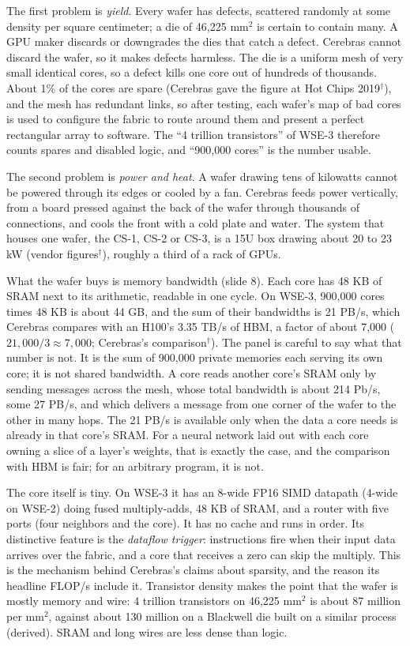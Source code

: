 \documentclass[11pt,letterpaper]{article}
\begin{document}
The first problem is \emph{yield}. Every wafer has defects, scattered randomly at some density per square centimeter; a die of 46{,}225 mm$^2$ is certain to contain many. A GPU maker discards or downgrades the dies that catch a defect. Cerebras cannot discard the wafer, so it makes defects harmless. The die is a uniform mesh of very small identical cores, so a defect kills one core out of hundreds of thousands. About 1\% of the cores are spare (Cerebras gave the figure at Hot Chips 2019$^\dagger$), and the mesh has redundant links, so after testing, each wafer's map of bad cores is used to configure the fabric to route around them and present a perfect rectangular array to software. The ``4 trillion transistors'' of WSE-3 therefore counts spares and disabled logic, and ``900{,}000 cores'' is the number usable.

The second problem is \emph{power and heat}. A wafer drawing tens of kilowatts cannot be powered through its edges or cooled by a fan. Cerebras feeds power vertically, from a board pressed against the back of the wafer through thousands of connections, and cools the front with a cold plate and water. The system that houses one wafer, the CS-1, CS-2 or CS-3, is a 15U box drawing about 20 to 23 kW (vendor figures$^\dagger$), roughly a third of a rack of GPUs.

What the wafer buys is memory bandwidth (slide 8). Each core has 48 KB of SRAM next to its arithmetic, readable in one cycle. On WSE-3, 900{,}000 cores times 48 KB is about 44 GB, and the sum of their bandwidths is 21 PB/s, which Cerebras compares with an H100's 3.35 TB/s of HBM, a factor of about 7{,}000 ($21{,}000 / 3 \approx 7{,}000$; Cerebras's comparison$^\dagger$). The panel is careful to say what that number is not. It is the sum of 900{,}000 private memories each serving its own core; it is not shared bandwidth. A core reads another core's SRAM only by sending messages across the mesh, whose total bandwidth is about 214 Pb/s, some 27 PB/s, and which delivers a message from one corner of the wafer to the other in many hops. The 21 PB/s is available only when the data a core needs is already in that core's SRAM. For a neural network laid out with each core owning a slice of a layer's weights, that is exactly the case, and the comparison with HBM is fair; for an arbitrary program, it is not.

The core itself is tiny. On WSE-3 it has an 8-wide FP16 SIMD datapath (4-wide on WSE-2) doing fused multiply-adds, 48 KB of SRAM, and a router with five ports (four neighbors and the core). It has no cache and runs in order. Its distinctive feature is the \emph{dataflow trigger}: instructions fire when their input data arrives over the fabric, and a core that receives a zero can skip the multiply. This is the mechanism behind Cerebras's claims about sparsity, and the reason its headline FLOP/s include it. Transistor density makes the point that the wafer is mostly memory and wire: 4 trillion transistors on 46{,}225 mm$^2$ is about 87 million per mm$^2$, against about 130 million on a Blackwell die built on a similar process (derived). SRAM and long wires are less dense than logic.
\end{document}
